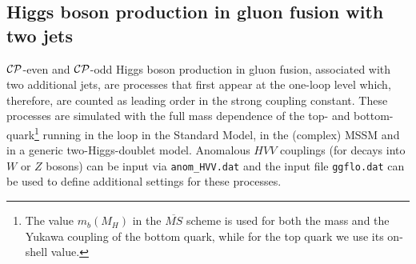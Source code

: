 \documentclass[english,12pt]{article}
\begin{document}
\subsection{Higgs boson production in gluon fusion with two jets}

%
$\cal{CP}$-even and $\cal{CP}$-odd Higgs boson production in gluon fusion,
associated with two additional jets, are processes that first appear at the
one-loop level which, therefore, are counted as leading order in the strong
coupling constant. These processes are simulated with the
full mass dependence of the top- and bottom-quark\footnote{The value
$m_{b}(M_{H})$ in the $\overline{MS}$ scheme is used for both the mass
and the Yukawa coupling of the bottom quark, while for the top quark we
use its on-shell value.} running in the loop in the Standard Model, in
the (complex) MSSM and in a generic two-Higgs-doublet model.  Anomalous
$HVV$ couplings (for decays into $W$ or $Z$ bosons) can be input via
{\tt anom\_HVV.dat} and the input file {\tt ggflo.dat} can be used to
define additional settings for these processes.
%
\end{document}
